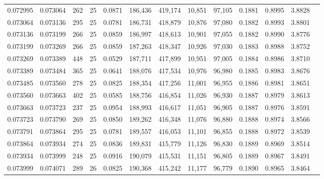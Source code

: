 \begin{tabular}{rrrrrrrrrrrrr}
0.072995 & 0.073064 &   262 &  25 &                                     0.0871 & 186,436 & 419,174 &  10,851 &  97,105 & 0.1881 & 0.8995 & 3.8828 \\
0.073064 & 0.073136 &   295 &  25 &                                     0.0781 & 186,731 & 418,879 &  10,876 &  97,080 & 0.1882 & 0.8993 & 3.8801 \\
0.073136 & 0.073199 &   266 &  25 &                                     0.0859 & 186,997 & 418,613 &  10,901 &  97,055 & 0.1882 & 0.8990 & 3.8776 \\
0.073199 & 0.073269 &   266 &  25 &                                     0.0859 & 187,263 & 418,347 &  10,926 &  97,030 & 0.1883 & 0.8988 & 3.8752 \\
0.073269 & 0.073389 &   448 &  25 &                                     0.0529 & 187,711 & 417,899 &  10,951 &  97,005 & 0.1884 & 0.8986 & 3.8710 \\
0.073389 & 0.073484 &   365 &  25 &                                     0.0641 & 188,076 & 417,534 &  10,976 &  96,980 & 0.1885 & 0.8983 & 3.8676 \\
0.073485 & 0.073560 &   278 &  25 &                                     0.0825 & 188,354 & 417,256 &  11,001 &  96,955 & 0.1886 & 0.8981 & 3.8651 \\
0.073560 & 0.073663 &   402 &  25 &                                     0.0585 & 188,756 & 416,854 &  11,026 &  96,930 & 0.1887 & 0.8979 & 3.8613 \\
0.073663 & 0.073723 &   237 &  25 &                                     0.0954 & 188,993 & 416,617 &  11,051 &  96,905 & 0.1887 & 0.8976 & 3.8591 \\
0.073723 & 0.073790 &   269 &  25 &                                     0.0850 & 189,262 & 416,348 &  11,076 &  96,880 & 0.1888 & 0.8974 & 3.8566 \\
0.073791 & 0.073864 &   295 &  25 &                                     0.0781 & 189,557 & 416,053 &  11,101 &  96,855 & 0.1888 & 0.8972 & 3.8539 \\
0.073864 & 0.073934 &   274 &  25 &                                     0.0836 & 189,831 & 415,779 &  11,126 &  96,830 & 0.1889 & 0.8969 & 3.8514 \\
0.073934 & 0.073999 &   248 &  25 &                                     0.0916 & 190,079 & 415,531 &  11,151 &  96,805 & 0.1889 & 0.8967 & 3.8491 \\
0.073999 & 0.074071 &   289 &  26 &                                     0.0825 & 190,368 & 415,242 &  11,177 &  96,779 & 0.1890 & 0.8965 & 3.8464 \\

\end{tabular}
